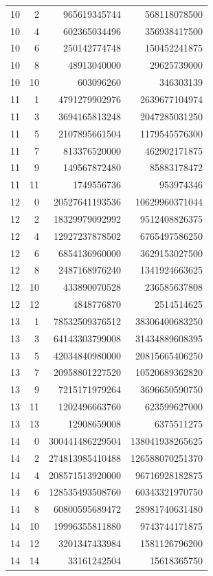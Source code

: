 \begin{longtable}{@{}rrrr@{}}
10 & 2 & 965619345744 & 568118078500\\
10 & 4 & 602365034496 & 356938417500\\
10 & 6 & 250142774748 & 150452241875\\
10 & 8 & 48913040000 & 29625739000\\
10 & 10 & 603096260 & 346303139\\
11 & 1 & 4791279902976 & 2639677104974\\
11 & 3 & 3694165813248 & 2047285031250\\
11 & 5 & 2107895661504 & 1179545576300\\
11 & 7 & 813376520000 & 462902171875\\
11 & 9 & 149567872480 & 85883178472\\
11 & 11 & 1749556736 & 953974346\\
12 & 0 & 20527641193536 & 10629960371044\\
12 & 2 & 18329979092992 & 9512408826375\\
12 & 4 & 12927237878502 & 6765497586250\\
12 & 6 & 6854136960000 & 3629153027500\\
12 & 8 & 2487168976240 & 1341924663625\\
12 & 10 & 433890070528 & 236585637808\\
12 & 12 & 4848776870 & 2514514625\\
13 & 1 & 78532509376512 & 38306400683250\\
13 & 3 & 64143303799008 & 31434889608395\\
13 & 5 & 42034840980000 & 20815665406250\\
13 & 7 & 20958801227520 & 10520689362820\\
13 & 9 & 7215171979264 & 3696650590750\\
13 & 11 & 1202496663760 & 623599627000\\
13 & 13 & 12908659008 & 6375511275\\
14 & 0 & 300441486229504 & 138041938265625\\
14 & 2 & 274813985410488 & 126588070251370\\
14 & 4 & 208571513920000 & 96716928182875\\
14 & 6 & 128535493508760 & 60343321970750\\
14 & 8 & 60800595689472 & 28981740631480\\
14 & 10 & 19996355811880 & 9743744171875\\
14 & 12 & 3201347433984 & 1581126796200\\
14 & 14 & 33161242504 & 15618365750\\

\end{longtable}
